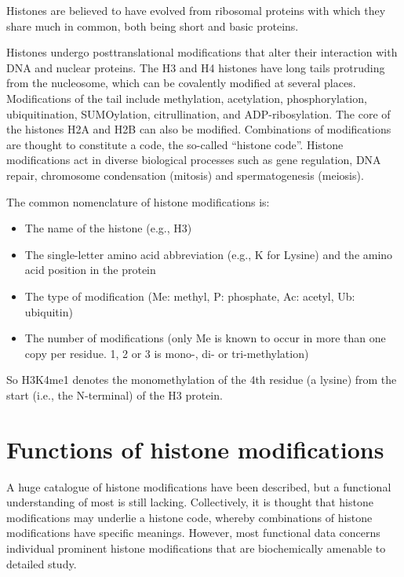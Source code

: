 Histones are believed to have evolved from ribosomal proteins with which they share much in common, both being short and basic proteins.

Histones undergo posttranslational modifications that alter their interaction with DNA and nuclear proteins. The H3 and H4 histones have long tails protruding from the nucleosome, which can be covalently modified at several places. Modifications of the tail include methylation, acetylation, phosphorylation, ubiquitination, SUMOylation, citrullination, and ADP-ribosylation. The core of the histones H2A and H2B can also be modified. Combinations of modifications are thought to constitute a code, the so-called ``histone code''. Histone modifications act in diverse biological processes such as gene regulation, DNA repair, chromosome condensation (mitosis) and spermatogenesis (meiosis).

The common nomenclature of histone modifications is:

\begin{itemize}
\tightlist
\item
  The name of the histone (e.g., H3)
\item
  The single-letter amino acid abbreviation (e.g., K for Lysine) and the amino acid position in the protein
\item
  The type of modification (Me: methyl, P: phosphate, Ac: acetyl, Ub: ubiquitin)
\item
  The number of modifications (only Me is known to occur in more than one copy per residue. 1, 2 or 3 is mono-, di- or tri-methylation)
\end{itemize}

So H3K4me1 denotes the monomethylation of the 4th residue (a lysine) from the start (i.e., the N-terminal) of the H3 protein.

\hypertarget{functions-of-histone-modifications}{%
\section{Functions of histone modifications}\label{functions-of-histone-modifications}}

A huge catalogue of histone modifications have been described, but a functional understanding of most is still lacking. Collectively, it is thought that histone modifications may underlie a histone code, whereby combinations of histone modifications have specific meanings. However, most functional data concerns individual prominent histone modifications that are biochemically amenable to detailed study.

